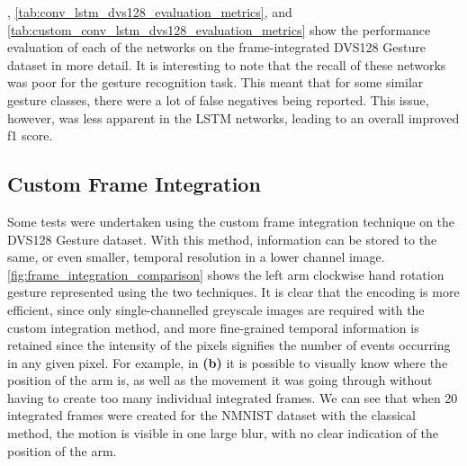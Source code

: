 , \cref{tab:conv_lstm_dvs128_evaluation_metrics}, and \cref{tab:custom_conv_lstm_dvs128_evaluation_metrics} show the performance evaluation of each of the networks on the frame-integrated DVS128 Gesture dataset in more detail. It is interesting to note that the recall of these networks was poor for the gesture recognition task. This meant that for some similar gesture classes, there were a lot of false negatives being reported. This issue, however, was less apparent in the LSTM networks, leading to an overall improved f1 score.

\subsection{Custom Frame Integration}

Some tests were undertaken using the custom frame integration technique on the DVS128 Gesture dataset. With this method, information can be stored to the same, or even smaller, temporal resolution in a lower channel image. \cref{fig:frame_integration_comparison} shows the left arm clockwise hand rotation gesture represented using the two techniques. It is clear that the encoding is more efficient, since only single-channelled greyscale images are required with the custom integration method, and more fine-grained temporal information is retained since the intensity of the pixels signifies the number of events occurring in any given pixel. For example, in \textbf{(b)} it is possible to visually know where the position of the arm is, as well as the movement it was going through without having to create too many individual integrated frames. We can see that when 20 integrated frames were created for the NMNIST dataset with the classical method, the motion is visible in one large blur, with no clear indication of the position of the arm.

